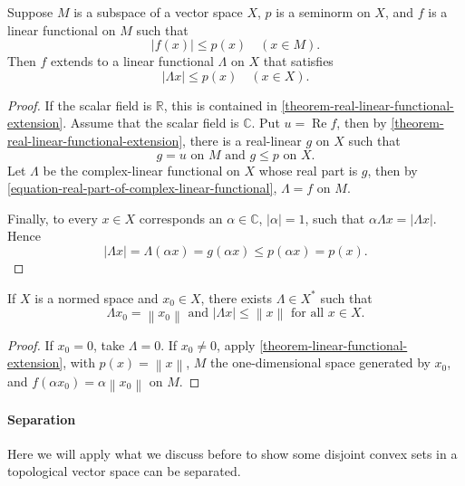 \begin{theorem}
  \label{theorem-linear-functional-extension}
  Suppose \( M \) is a subspace of a vector space \( X \), \( p \) is a seminorm on \( X \), and \( f \) is a linear functional  on \( M \) such that
  \[
    \left\lvert f(x) \right\rvert \leq p(x) \quad (x \in M).
  \]
  Then \( f \) extends to a linear functional \( \Lambda \) on \( X \) that satisfies
  \[
    \left\lvert \Lambda x \right\rvert \leq p(x) \quad (x \in X).
  \]
\end{theorem}
\begin{proof}
  If the scalar field is \( \mathbb{R} \), this is contained in \ref{theorem-real-linear-functional-extension}.
  Assume that the scalar field is \( \mathbb{C} \).
  Put \( u = \operatorname{Re} f \), then by \ref{theorem-real-linear-functional-extension}, there is a real-linear \( g \) on \( X \) such that
  \[
    g = u \text{ on } M \text{ and } g \leq p \text{ on } X.
  \]
  Let \( \Lambda \) be the complex-linear functional on \( X \) whose real part is \( g \), then by \eqref{equation-real-part-of-complex-linear-functional}, \( \Lambda = f \) on \( M \).

  Finally, to every \( x \in X \) corresponds an \( \alpha \in \mathbb{C} \), \( \left\lvert \alpha \right\rvert = 1 \), such that \( \alpha \Lambda x = \left\lvert \Lambda x \right\rvert \).
  Hence
  \[
    \left\lvert \Lambda x \right\rvert = \Lambda(\alpha x) = g(\alpha x) \leq p(\alpha x) = p(x).
  \]
\end{proof}

\begin{corollary}
  \label{corollary-linear-functional-extension}
  If \( X \) is a normed space and \( x_0 \in X \), there exists \( \Lambda \in X^* \) such that
  \[
    \Lambda x_0 = \left\lVert x_0 \right\rVert \text{ and } \left\lvert \Lambda x \right\rvert \leq \left\lVert x \right\rVert \text{ for all } x \in X.
  \]
\end{corollary}
\begin{proof}
  If \( x_0 = 0 \), take \( \Lambda = 0 \).
  If \( x_0 \neq 0 \), apply \ref{theorem-linear-functional-extension}, with \( p(x) = \left\lVert x \right\rVert \), \( M \) the one-dimensional space generated by \( x_0 \), and \( f(\alpha x_0) = \alpha \left\lVert x_0 \right\rVert \) on \( M \).
\end{proof}

\paragraph{Separation} Here we will apply what we discuss before to show some disjoint convex sets in a topological vector space can be separated.


